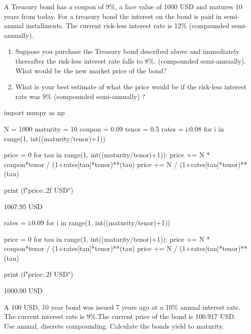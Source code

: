 \begin{question}
A Treasury bond has a coupon of 9\%, a face value of 1000 USD and matures 10 years from today. For a treasury bond the interest on the bond is paid in semi-annual installments. The current risk-less interest rate is 12\% (compounded semi-annually).
\begin{enumerate}
\item Suppose you purchase the Treasury bond described above and immediately thereafter the risk-less interest rate falls to 8\%. (compounded semi-annually). What would be the new market price of the bond?
\item What is your best estimate of what the price would be if the risk-less interest rate was 9\% (compounded semi-annually) ?
\end{enumerate}
\end{question}

\cprotEnv\begin{solution}
\begin{ipython}
import numpy as np

N = 1000
maturity = 10
coupon = 0.09
tenor = 0.5
rates = {i:0.08 for i in range(1, int((maturity/tenor)+1))}

price = 0
for tau in range(1, int((maturity/tenor)+1)):
    price += N * coupon*tenor / (1+rates[tau]*tenor)**(tau)
price += N / (1+rates[tau]*tenor)**(tau) 

print (f"{price:.2f} USD")
\end{ipython}
\begin{ioutput}
1067.95 USD
\end{ioutput}

\begin{ipython}
rates = {i:0.09 for i in range(1, int((maturity/tenor)+1))}
	
price = 0
for tau in range(1, int((maturity/tenor)+1)):
    price += N * coupon*tenor / (1+rates[tau]*tenor)**(tau)
price += N / (1+rates[tau]*tenor)**(tau) 
	
print (f"{price:.2f} USD")
\end{ipython}
\begin{ioutput}
1000.00 USD
\end{ioutput}
\end{solution}

\begin{question}
A 100 USD, 10 year bond was issued 7 years ago at a 10\% annual interest rate. The current interest rate is 9\%.The current price of the bond is 100.917 USD. Use annual, discrete compounding. Calculate the bonds yield to maturity.
\end{question}

